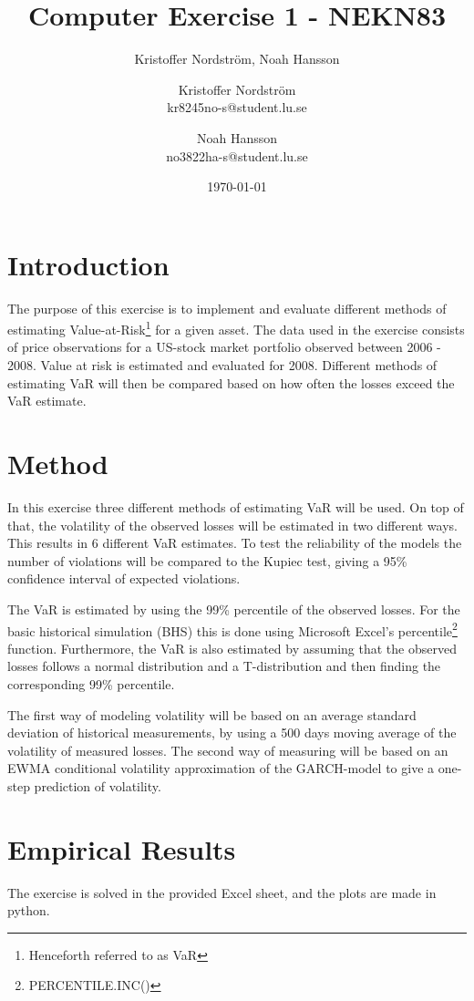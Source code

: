 \documentclass[a4paper]{article}
\title{Computer Exercise 1 - NEKN83}
\author{Kristoffer Nordström, Noah Hansson}\author{Kristoffer Nordström \\ kr8245no-s@student.lu.se \and  Noah Hansson \\ no3822ha-s@student.lu.se}
\date{\today}
\begin{document}
\maketitle

\section{Introduction}
The purpose of this exercise is to implement and evaluate different methods of estimating Value-at-Risk\footnote{Henceforth referred to as VaR} for a given asset. The data used in the exercise consists of price observations for a US-stock market portfolio observed between 2006 - 2008. Value at risk is estimated and evaluated for 2008. Different methods of estimating VaR will then be compared based on how often the losses exceed the VaR estimate.

\section{Method}
In this exercise three different methods of estimating VaR will be used. On top of that, the volatility of the observed losses will be estimated in two different ways. This results in 6 different VaR estimates. To test the reliability of the models the number of violations will be compared to the Kupiec test, giving a 95\% confidence interval of expected violations.
   
The VaR is estimated by using the 99\% percentile of the observed losses. For the basic historical simulation (BHS) this is done using Microsoft Excel's percentile\footnote{PERCENTILE.INC()} function. Furthermore, the VaR is also estimated by assuming that the observed losses follows a normal distribution and a T-distribution and then finding the corresponding 99\% percentile.

The first way of modeling volatility will be based on an average standard deviation of historical measurements, by using a 500 days moving average of the volatility of measured losses. The second way of measuring will be based on an EWMA conditional volatility approximation of the GARCH-model to give a one-step prediction of volatility.



\section{Empirical Results}
The exercise is solved in the provided Excel sheet, and the plots are made in python. 
\end{document}
